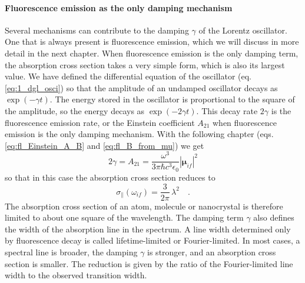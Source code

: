 \paragraph{Fluorescence emission as the only damping mechanism} Several mechanisms can contribute to the damping $\gamma$ of the Lorentz oscillator. One that is always present is fluorescence emission, which we will discuss in more detail in the next chapter. When fluorescence emission is the only damping term, the absorption cross section takes a very simple form, which is also its largest value. We have defined the differential equation of the oscillator (eq. \ref{eq:1_dgl_osci}) so that the amplitude of an undamped oscillator decays as $\exp(- \gamma t)$. The energy stored in the oscillator is proportional to the square of the amplitude, so the energy decays as $\exp(- 2 \gamma t)$. This decay rate $2\gamma$ is the fluorescence emission rate, or the Einstein coefficient $A_{21}$ when fluorescence emission is the only damping mechanism. With the following chapter (eqs. \ref{eq:fl_Einstein_A_B} and  \ref{eq:fl_B_from_mu})  we get
\begin{equation}
 2 \gamma =  A_{21} = \frac{\omega^3}{3 \pi \hbar c^3 \epsilon_0} |\mathbf{\mu}_{if} |^2  
\end{equation}
so that in this case the absorption cross section reduces to 
\begin{equation}
 \sigma_{\parallel}(\omega_{if}) =  \frac{3}{2 \pi} \, \lambda^2 \quad .
\end{equation}
The absorption cross section of an atom, molecule or nanocrystal is therefore limited to about one square of the wavelength. The damping term $\gamma$ also defines the width of the absorption line in the spectrum. A line width determined only by fluorescence decay is called lifetime-limited or Fourier-limited. In most cases, a spectral line is broader, the damping $\gamma$ is stronger, and an absorption cross section is smaller. The reduction is given by the ratio of the Fourier-limited line width to the observed transition width. 



